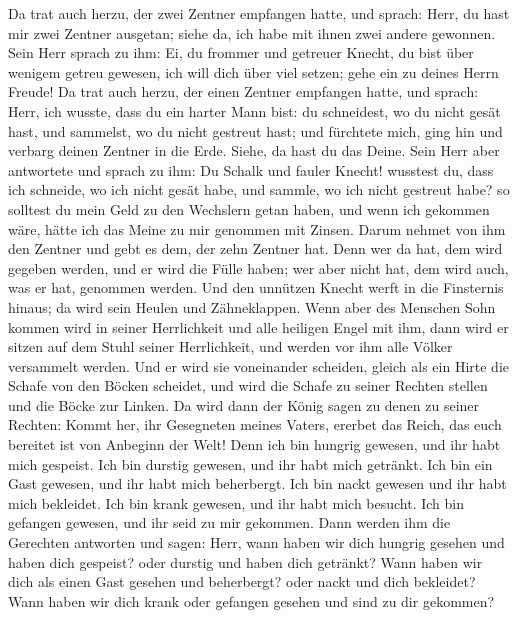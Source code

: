  Da trat auch herzu, der zwei Zentner empfangen hatte, und
sprach: Herr, du hast mir zwei Zentner ausgetan; siehe da, ich habe mit
ihnen zwei andere gewonnen.  Sein Herr sprach zu ihm: Ei,
du frommer und getreuer Knecht, du bist über wenigem getreu gewesen, ich
will dich über viel setzen; gehe ein zu deines Herrn Freude!
 Da trat auch herzu, der einen Zentner empfangen hatte, und
sprach: Herr, ich wusste, dass du ein harter Mann bist: du schneidest,
wo du nicht gesät hast, und sammelst, wo du nicht gestreut hast;
 und fürchtete mich, ging hin und verbarg deinen Zentner in
die Erde. Siehe, da hast du das Deine.  Sein Herr aber
antwortete und sprach zu ihm: Du Schalk und fauler Knecht! wusstest du,
dass ich schneide, wo ich nicht gesät habe, und sammle, wo ich nicht
gestreut habe?  so solltest du mein Geld zu den Wechslern
getan haben, und wenn ich gekommen wäre, hätte ich das Meine zu mir
genommen mit Zinsen.  Darum nehmet von ihm den Zentner und
gebt es dem, der zehn Zentner hat.  Denn wer da hat, dem
wird gegeben werden, und er wird die Fülle haben; wer aber nicht hat,
dem wird auch, was er hat, genommen werden.  Und den
unnützen Knecht werft in die Finsternis hinaus; da wird sein Heulen und
Zähneklappen.  Wenn aber des Menschen Sohn kommen wird in
seiner Herrlichkeit und alle heiligen Engel mit ihm, dann wird er sitzen
auf dem Stuhl seiner Herrlichkeit,  und werden vor ihm alle
Völker versammelt werden. Und er wird sie voneinander scheiden, gleich
als ein Hirte die Schafe von den Böcken scheidet,  und wird
die Schafe zu seiner Rechten stellen und die Böcke zur Linken.
 Da wird dann der König sagen zu denen zu seiner Rechten:
Kommt her, ihr Gesegneten meines Vaters, ererbet das Reich, das euch
bereitet ist von Anbeginn der Welt!  Denn ich bin hungrig
gewesen, und ihr habt mich gespeist. Ich bin durstig gewesen, und ihr
habt mich getränkt. Ich bin ein Gast gewesen, und ihr habt mich
beherbergt.  Ich bin nackt gewesen und ihr habt mich
bekleidet. Ich bin krank gewesen, und ihr habt mich besucht. Ich bin
gefangen gewesen, und ihr seid zu mir gekommen.  Dann
werden ihm die Gerechten antworten und sagen: Herr, wann haben wir dich
hungrig gesehen und haben dich gespeist? oder durstig und haben dich
getränkt?  Wann haben wir dich als einen Gast gesehen und
beherbergt? oder nackt und dich bekleidet?  Wann haben wir
dich krank oder gefangen gesehen und sind zu dir gekommen? 
